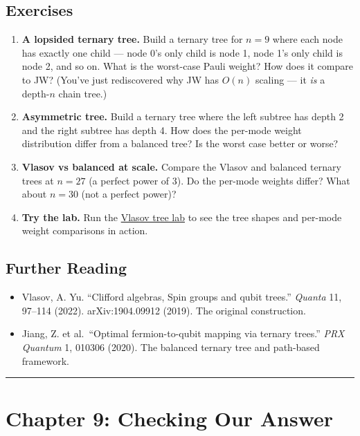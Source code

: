 \documentclass[
  11pt,
  oneside]{book}
\providecommand{\tightlist}{%
  \setlength{\itemsep}{0pt}\setlength{\parskip}{0pt}}
\begin{document}
\section{Exercises}\label{exercises-7}

\begin{enumerate}
\def\labelenumi{\arabic{enumi}.}
\item
  \textbf{A lopsided ternary tree.} Build a ternary tree for \(n = 9\)
  where each node has exactly one child --- node 0's only child is node
  1, node 1's only child is node 2, and so on. What is the worst-case
  Pauli weight? How does it compare to JW? (You've just rediscovered why
  JW has \(O(n)\) scaling --- it \emph{is} a depth-\(n\) chain tree.)
\item
  \textbf{Asymmetric tree.} Build a ternary tree where the left subtree
  has depth 2 and the right subtree has depth 4. How does the per-mode
  weight distribution differ from a balanced tree? Is the worst case
  better or worse?
\item
  \textbf{Vlasov vs balanced at scale.} Compare the Vlasov and balanced
  ternary trees at \(n = 27\) (a perfect power of 3). Do the per-mode
  weights differ? What about \(n = 30\) (not a perfect power)?
\item
  \textbf{Try the lab.} Run the
  \href{../labs/10-vlasov-tree.html}{Vlasov tree lab} to see the tree
  shapes and per-mode weight comparisons in action.
\end{enumerate}

\section{Further Reading}\label{further-reading-7}

\begin{itemize}
\tightlist
\item
  Vlasov, A. Yu. ``Clifford algebras, Spin groups and qubit trees.''
  \emph{Quanta} 11, 97--114 (2022). arXiv:1904.09912 (2019). The
  original construction.
\item
  Jiang, Z. et al.~``Optimal fermion-to-qubit mapping via ternary
  trees.'' \emph{PRX Quantum} 1, 010306 (2020). The balanced ternary
  tree and path-based framework.
\end{itemize}

\begin{center}\rule{0.5\linewidth}{0.5pt}\end{center}

\chapter{Chapter 9: Checking Our
Answer}\label{chapter-9-checking-our-answer}
\end{document}
